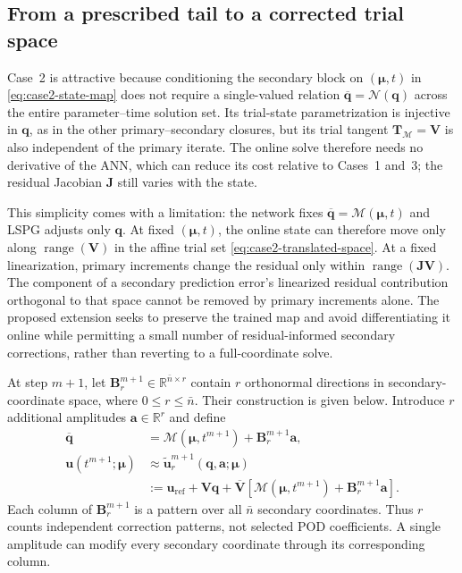 \documentclass[11pt]{article}
\newcommand{\q}{\mathbf q}
\newcommand{\qbar}{\overline{\mathbf q}}
\newcommand{\uvec}{\mathbf u}
\newcommand{\utilde}{\widetilde{\mathbf u}}
\newcommand{\mub}{\bm\mu}
\begin{document}
\subsection{From a prescribed tail to a corrected trial space}
Case~2 is attractive because conditioning the secondary block on $(\mub,t)$
in \eqref{eq:case2-state-map} does not require a single-valued relation
$\qbar=\mathcal N(\q)$ across
the entire parameter--time solution set.  Its trial-state parametrization
is injective in $\q$, as in the other primary--secondary closures, but its
trial tangent $\mathbf T_{\mathcal M}=\mathbf V$ is also independent of the
primary iterate.  The online solve therefore needs no derivative of the
ANN, which can reduce its cost relative to Cases~1 and~3; the residual
Jacobian $\mathbf J$ still varies with the state.

This simplicity comes with a limitation: the network fixes
$\qbar=\mathcal M(\mub,t)$ and LSPG adjusts only $\q$.  At fixed
$(\mub,t)$, the online state can therefore move only along
$\operatorname{range}(\mathbf V)$ in the affine trial set
\eqref{eq:case2-translated-space}.  At a fixed linearization, primary
increments change the residual only within
$\operatorname{range}(\mathbf J\mathbf V)$.  The component of a secondary
prediction error's linearized residual contribution orthogonal to that
space cannot be removed by primary increments alone.  The proposed
extension seeks to preserve the trained map and avoid differentiating it
online while permitting a small number of residual-informed secondary
corrections, rather than reverting to a full-coordinate solve.

At step $m+1$, let $\mathbf B_r^{m+1}\in\mathbb R^{\bar n\times r}$
contain $r$ orthonormal directions in secondary-coordinate space, where
$0\leq r\leq\bar n$.  Their construction is given below.  Introduce
$r$ additional amplitudes $\mathbf a\in\mathbb R^r$ and define
\begin{equation}
\begin{aligned}
\qbar&=\mathcal M(\mub,t^{m+1})+\mathbf B_r^{m+1}\mathbf a,\\
\uvec(t^{m+1};\mub)&\approx
\utilde_r^{m+1}(\q,\mathbf a;\mub)\\
&:=\uvec_{\mathrm{ref}}+\mathbf V\q+
\overline{\mathbf V}
\left[\mathcal M(\mub,t^{m+1})+\mathbf B_r^{m+1}\mathbf a\right].
\end{aligned}
\label{eq:adaptive-trial}
\end{equation}
Each column of $\mathbf B_r^{m+1}$ is a pattern over all $\bar n$
secondary coordinates.  Thus $r$ counts independent correction patterns,
not selected POD coefficients.  A single amplitude can modify every
secondary coordinate through its corresponding column.
\end{document}
